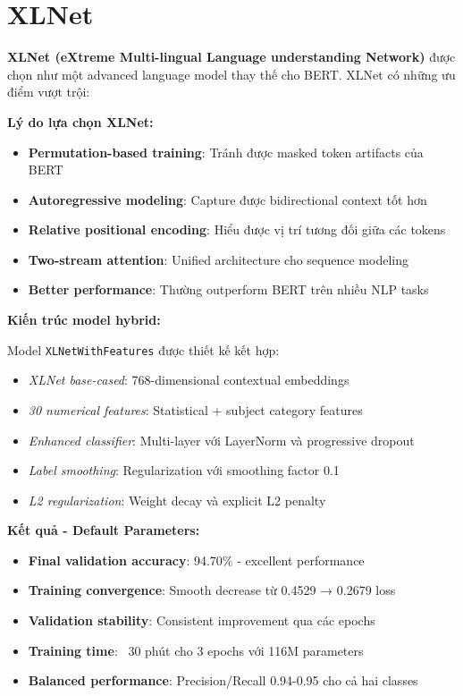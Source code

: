 \newpage
\section{XLNet}

\textbf{XLNet (eXtreme Multi-lingual Language understanding Network)} được chọn như một advanced language model thay thế cho BERT. XLNet có những ưu điểm vượt trội:

\textbf{Lý do lựa chọn XLNet:}
\begin{itemize}
    \item \textbf{Permutation-based training}: Tránh được masked token artifacts của BERT
    \item \textbf{Autoregressive modeling}: Capture được bidirectional context tốt hơn
    \item \textbf{Relative positional encoding}: Hiểu được vị trí tương đối giữa các tokens
    \item \textbf{Two-stream attention}: Unified architecture cho sequence modeling
    \item \textbf{Better performance}: Thường outperform BERT trên nhiều NLP tasks
\end{itemize}

\textbf{Kiến trúc model hybrid:}

Model \texttt{XLNetWithFeatures} được thiết kế kết hợp:
\begin{itemize}
    \item \textit{XLNet base-cased}: 768-dimensional contextual embeddings
    \item \textit{30 numerical features}: Statistical + subject category features
    \item \textit{Enhanced classifier}: Multi-layer với LayerNorm và progressive dropout
    \item \textit{Label smoothing}: Regularization với smoothing factor 0.1
    \item \textit{L2 regularization}: Weight decay và explicit L2 penalty
\end{itemize}

\textbf{Kết quả - Default Parameters:}
\begin{itemize}
    \item \textbf{Final validation accuracy}: 94.70\% - excellent performance
    \item \textbf{Training convergence}: Smooth decrease từ 0.4529 → 0.2679 loss
    \item \textbf{Validation stability}: Consistent improvement qua các epochs
    \item \textbf{Training time}: ~30 phút cho 3 epochs với 116M parameters
    \item \textbf{Balanced performance}: Precision/Recall 0.94-0.95 cho cả hai classes
\end{itemize}

